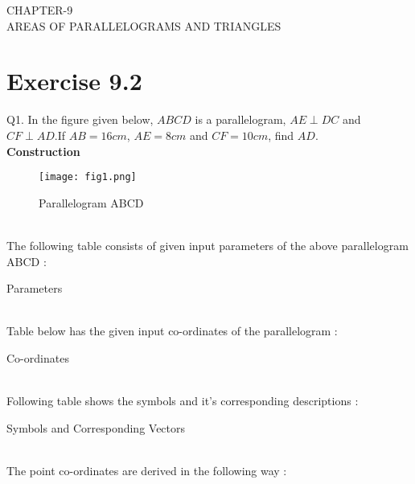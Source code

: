 \documentclass{article}
\begin{document}
\begin{center}
        \textbf\large{CHAPTER-9 \\ AREAS OF PARALLELOGRAMS AND TRIANGLES}
\end{center}
\section{Exercise 9.2}
Q1. In the figure given below, $ABCD$ is a parallelogram, $AE \perp DC$ and $CF \perp AD$.If $AB = 16cm$, $AE = 8cm$ and $CF = 10cm$, find $AD$.\\
\textbf{Construction}\\
\begin{figure}[h]
 \begin{center}
  \texttt{[image: fig1.png]}
 \end{center}
 \caption{Parallelogram ABCD}
 \label{fig:Fig}
\end{figure}\\
\pagebreak
The following table consists of given input parameters of the above parallelogram ABCD :\\
\begin{table}[h]
\centering
	
	\caption{Parameters}
	\label{tab:table1}
\end{table}\\
Table below has the given input co-ordinates of the parallelogram :\\
\begin{table}[h]
	\centering
	
	\caption{Co-ordinates}
	\label{tab:table2}
\end{table}\\
Following table shows the symbols and it's corresponding descriptions :\\
\begin{table}[h]
	\centering
	
	\caption{Symbols and Corresponding Vectors}
	\label{tab:table3}
\end{table}\\
The point co-ordinates are derived in the following way : \\
\end{document}
